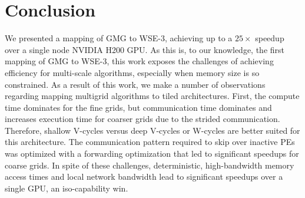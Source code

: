 \documentclass[conference]{IEEEtran}
\begin{document}
    \section{Conclusion}
        We presented a mapping of GMG to WSE-3, achieving up to a \(25\times\) speedup over a single node NVIDIA H200 GPU.  As this is, to our knowledge, the first mapping of GMG to WSE-3, this work exposes the challenges of achieving efficiency for multi-scale algorithms, especially when memory size is so constrained. As a result of this work, we make a number of observations regarding mapping multigrid algorithms to tiled architectures.  First, the compute time dominates for the fine grids, but communication time dominates and increases execution time for coarser grids due to the strided communication.  Therefore, shallow V-cycles versus deep V-cycles or W-cycles are better suited for this architecture. The communication pattern required to skip over inactive PEs was optimized with a forwarding optimization that led to significant speedups for coarse grids.
        In spite of these challenges, deterministic, high-bandwidth memory access times and local network bandwidth lead to significant speedups over a single GPU, an iso-capability win.
\end{document}

